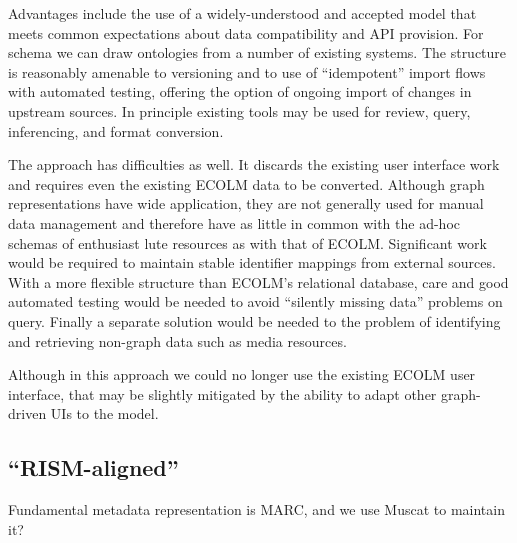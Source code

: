 \documentclass[sigconf]{acmart}
\begin{document}
\begin{sloppypar}
  Advantages include the use of a widely-understood and accepted model
  that meets common expectations about data compatibility and API
  provision. For schema we can draw ontologies from a number of
  existing systems. The structure is reasonably amenable to versioning
  and to use of ``idempotent'' import flows with automated testing,
  offering the option of ongoing import of changes in upstream
  sources. In principle existing tools may be used for review, query,
  inferencing, and format conversion.

  The approach has difficulties as well. It discards the existing user
  interface work and requires even the existing ECOLM data to be
  converted. Although graph representations have wide application,
  they are not generally used for manual data management and therefore
  have as little in common with the ad-hoc schemas of enthusiast lute
  resources as with that of ECOLM. Significant work would be required
  to maintain stable identifier mappings from external sources. With a
  more flexible structure than ECOLM's relational database, care and
  good automated testing would be needed to avoid ``silently missing
  data'' problems on query. Finally a separate solution would be
  needed to the problem of identifying and retrieving non-graph data
  such as media resources.

  Although in this approach we could no longer use the existing ECOLM
  user interface, that may be slightly mitigated by the ability to
  adapt other graph-driven UIs to the model.
  
  \subsection{``RISM-aligned''}

  Fundamental metadata representation is MARC, and we use Muscat to
  maintain it? 
  
\end{sloppypar}
\end{document}
